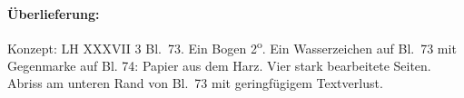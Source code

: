 %
%
%
%
%
\frenchspacing%
%
\begin{ledgroupsized}[r]{120mm}
\footnotesize
\pstart
\noindent\textbf{Überlieferung:}
\pend
\end{ledgroupsized}
\begin{ledgroupsized}[r]{114mm}
\footnotesize
\pstart \parindent -6mm
%
Konzept: LH XXXVII 3 Bl.~73.
Ein Bogen 2\textsuperscript{o}.
Ein Wasserzeichen auf Bl.~73 mit Gegen\-marke auf Bl. 74:
Papier aus dem Harz.
Vier stark bearbeitete Seiten.
Abriss am unteren Rand von Bl.~73 mit geringfügigem Textverlust.
\pend
\end{ledgroupsized}
%
%
%
\frenchspacing%
%
%
\vspace{8mm}

